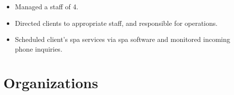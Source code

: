 \documentclass[11.99pt,letterpaper,sans]{moderncv}        %
\begin{document}
{\begin{itemize}%
	\item Managed a staff of 4.
	\item Directed clients to appropriate staff, and responsible for operations.
	\item Scheduled client’s spa services via spa software and monitored incoming phone inquiries.
	\end{itemize} }

\section{Organizations}

\nocite{*}



\end{document}
